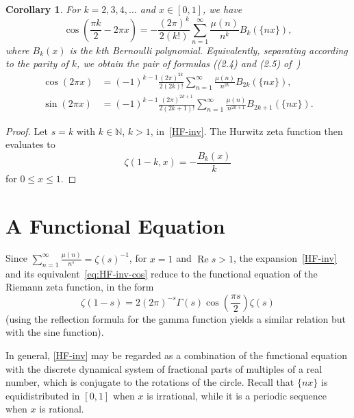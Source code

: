 \documentclass[11pt,a4paper,reqno]{amsart}
\newcommand{\N}{\mathbb{N}}
\renewcommand{\Re}{\operatorname{Re}}
\theoremstyle{plain}
\newtheorem{cor}[theorem]{Corollary}
\theoremstyle{remark}
\numberwithin{equation}{section}
\begin{document}
\begin{cor}
\label{cor:Ber-inv}
For $k = 2,3,4,\dots$ and $x \in [0,1]$, we have
%
\begin{equation*}
	  \cos\left( \frac{\pi k}{2} - 2 \pi x \right)
	= - \frac{(2\pi)^{k}}{2 (k!)} \sum_{n=1}^{\infty} \frac{\mu(n)}{n^{k}} B_{k}(\{nx\}),
\end{equation*}
%
where $B_{k}(x)$ is the $k$th Bernoulli polynomial. Equivalently, separating according to the parity of $k$, we obtain the pair of formulas ((2.4) and (2.5) of~\cite{NRV-JAT})
%
\begin{equation*}
	\begin{aligned}
		\cos(2 \pi x) &= (-1)^{k-1} \frac{(2\pi)^{2k}}{2 (2k)!}
		                 \sum_{n=1}^{\infty} \frac{\mu(n)}{n^{2k}} B_{2k}(\{nx\}),
					  \\
		\sin(2 \pi x) &= (-1)^{k-1} \frac{(2\pi)^{2k+1}}{2 (2k+1)!}
		                 \sum_{n=1}^{\infty} \frac{\mu(n)}{n^{2k+1}} B_{2k+1}(\{nx\}).
	\end{aligned}
\end{equation*}
%
\end{cor}

\begin{proof}
Let $s = k$ with $k \in \N$, $k > 1$, in~\eqref{HF-inv}.
The Hurwitz zeta function then evaluates to
%
\begin{equation*}
	\zeta(1-k,x) = - \frac{B_{k}(x)}{k}
\end{equation*}
%
for $0 \leq x \leq 1.$
\end{proof}



\section{A Functional Equation}
\label{sec:functionaleq}


Since $\sum_{n=1}^{\infty} \frac{\mu(n)}{n^{s}} = \zeta(s)^{-1}$, for $x = 1$ and $\Re s > 1$, the expansion~\eqref{HF-inv} and its equivalent~\eqref{eq:HF-inv-cos} reduce to the functional equation of the Riemann zeta function, in the form
\[
	\zeta(1-s) = 2 (2 \pi)^{-s} \Gamma(s) \cos\left(\frac{\pi s}{2}\right) \zeta(s)
\]
(using the reflection formula for the gamma function yields a similar relation but with the sine function).


In general, \eqref{HF-inv} may be regarded as a combination of the functional equation with the discrete dynamical system of fractional parts of multiples of a real number, which is conjugate to the rotations of the circle. Recall that $\{nx\}$ is equidistributed in $[0,1]$ when $x$ is irrational, while it is a periodic sequence when $x$ is rational. 
\end{document}
